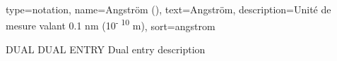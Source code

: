 



{
	type=notation,
	name={Angstr\" om (\angstrom)},
    text=Angstr\" om,
	description={Unité de mesure valant 0.1 nm (10\textsuperscript{- 10} m)},
	sort={angstrom}
}



  {DUAL}            %
  {DUAL ENTRY}  %
  {Dual entry description} %
  
